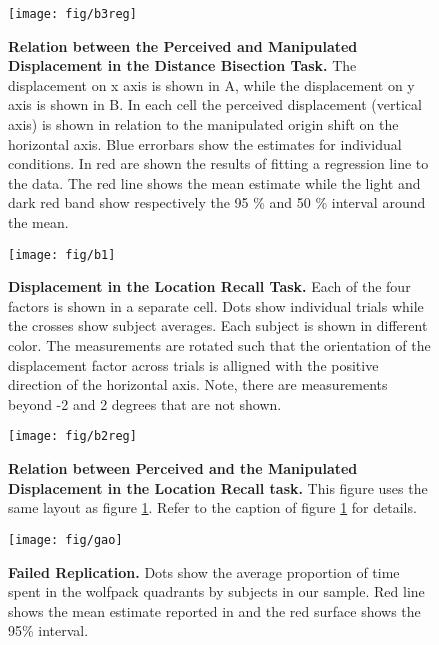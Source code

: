 \documentclass[10pt]{article}
\begin{document}
\begin{figure}[!ht]
\begin{center}
\texttt{[image: fig/b3reg]}
\end{center}
\caption{
{\bf Relation between the Perceived and Manipulated Displacement in the Distance Bisection Task.} The displacement on x axis is shown in A, while the displacement on y axis is shown in B. In each cell the perceived displacement (vertical axis) is shown in relation to the manipulated origin shift on the horizontal axis.  
Blue errorbars show the estimates for individual conditions. In red are shown the results of fitting a regression line to the data. The red line shows the mean estimate while the light and dark red band show respectively the 95 \% and 50 \% interval around the mean. }
\label{fig:b3reg}
\end{figure}

\begin{figure}[!ht]
\begin{center}
\texttt{[image: fig/b1]}
\end{center}
\caption{
{\bf Displacement in the Location Recall Task.}
Each of the four factors is shown in a separate cell. Dots show individual trials while the crosses show subject averages. Each subject is shown in different color. The measurements are rotated such that the orientation of the displacement factor across trials is alligned with the positive direction of the horizontal axis. Note, there are measurements beyond -2 and 2 degrees that are not shown.
}\label{fig:b1}
\end{figure}

\begin{figure}[!ht]
\begin{center}
\texttt{[image: fig/b2reg]}
\end{center}
\caption{
{\bf Relation between Perceived and the Manipulated Displacement in the Location Recall task.}
This figure uses the same layout as figure \ref{fig:b3reg}. Refer to the caption of figure \ref{fig:b3reg} for details.
}\label{fig:b2reg}
\end{figure}

\begin{figure}[!ht]
\begin{center}
\texttt{[image: fig/gao]}
\end{center}
\caption{
{\bf Failed Replication.}
Dots show the average proportion of time spent in the wolfpack quadrants by subjects in our sample. 
Red line shows the mean estimate reported in \cite{gao10} and the red surface shows the 95\% interval.}
\label{fig:gao}
\end{figure}
\end{document}
